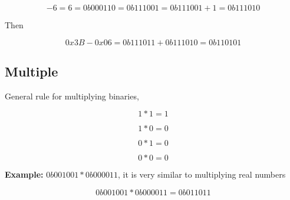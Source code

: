 \documentclass{article}
\begin{document}
\[
-6 = 6 = 0b000 110 = 0b111 001 = 0b111 001 + 1 = 0b111 010
\]

Then 

\[
0x3B - 0x06 = 0b11 1011 + 0b111 010 = 0b110 101
\]

\subsection*{Multiple} 
\noindent General rule for multiplying binaries,

\[
1 * 1 = 1
\]

\[
1 * 0 = 0
\]

\[
0 * 1 = 0
\]

\[
0 * 0 = 0
\]

\noindent \textbf{Example:} $0b001001 * 0b000011$, it is very similar to multiplying real numbers

\[
0b001001 * 0b000011 = 0b011011
\]
\end{document}
